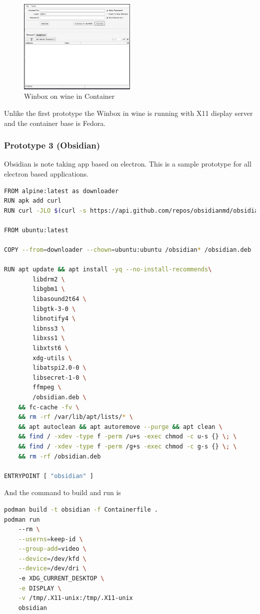 \documentclass[journal,onecolumn]{IEEEtran}
\begin{document}
\begin{figure}[ht]
    \centering
    \includegraphics[width=0.5\textwidth]{proto-winbox}
    \caption{Winbox on wine in Container}
    \label{fig:proto-winbox}
\end{figure}

Unlike the first prototype the Winbox in wine is running with X11 display server and the container base is Fedora.

\newpage
\subsubsection{Prototype 3 (Obsidian)}
Obsidian is note taking app based on electron. This is a sample prototype for all electron based applications.

\begin{lstlisting}[language=Bash]
FROM alpine:latest as downloader
RUN apk add curl
RUN curl -JLO $(curl -s https://api.github.com/repos/obsidianmd/obsidian-releases/releases | grep -E ".*url.*amd64.deb" | cut -d '"' -f4 | head -1)

FROM ubuntu:latest

COPY --from=downloader --chown=ubuntu:ubuntu /obsidian* /obsidian.deb

RUN apt update && apt install -yq --no-install-recommends\
        libdrm2 \
        libgbm1 \
        libasound2t64 \
        libgtk-3-0 \
        libnotify4 \
        libnss3 \
        libxss1 \
        libxtst6 \
        xdg-utils \
        libatspi2.0-0 \
        libsecret-1-0 \
        ffmpeg \
        /obsidian.deb \
    && fc-cache -fv \
    && rm -rf /var/lib/apt/lists/* \
    && apt autoclean && apt autoremove --purge && apt clean \
    && find / -xdev -type f -perm /u+s -exec chmod -c u-s {} \; \
    && find / -xdev -type f -perm /g+s -exec chmod -c g-s {} \; \
    && rm -rf /obsidian.deb

ENTRYPOINT [ "obsidian" ]
\end{lstlisting}
\newpage
And the command to build and run is
\begin{lstlisting}[language=Bash]
podman build -t obsidian -f Containerfile .
podman run
    --rm \
    --userns=keep-id \
    --group-add=video \
    --device=/dev/kfd \
    --device=/dev/dri \ 
    -e XDG_CURRENT_DESKTOP \
    -e DISPLAY \
    -v /tmp/.X11-unix:/tmp/.X11-unix
    obsidian 
\end{lstlisting}
\end{document}
